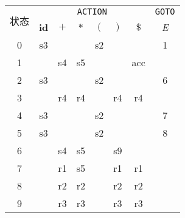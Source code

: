 \documentclass[border=1em,varwidth=\maxdimen]{standalone}
\begin{document}
\begin{table}
  \begin{tabular}{cccccccc}
    \toprule
    \multirow{2}{*}{状态} & \multicolumn{6}{c}{\texttt{ACTION}} &
                                                                  \texttt{GOTO}\\
    \cline{2-8}
                          & \textbf{id} & \(+\) & \(*\) & \((\) & \()\) & \(\$\)
                                                                & \textit{E}\\
    \midrule
    0 & s3 & & & s2 & & & 1\\
    1 & & s4 & s5 & & & acc & \\
    2 & s3 & & & s2 & & & 6\\
    3 & & r4 & r4 & & r4 & r4 & \\
    4 & s3 & & & s2 & & & 7\\
    5 & s3 & & & s2 & & & 8\\
    6 & & s4 & s5 & & s9 & & \\
    7 & & r1 & s5 & & r1 & r1 & \\
    8 & & r2 & r2 & & r2 & r2 & \\
    9 & & r3 & r3 & & r3 & r3 & \\
    \bottomrule
  \end{tabular}
\end{table}
\end{document}

